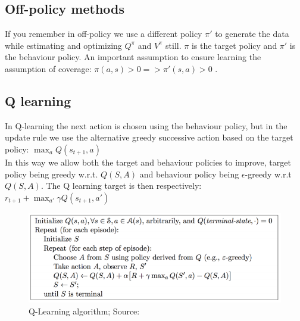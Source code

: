 
\subsection{Off-policy methods}

If you remember in off-policy we use a different policy $\pi'$ to generate the data while estimating and optimizing $Q^{\pi}$ and $V^{\pi}$ still. $\pi$ is the target policy and $\pi'$ is the  behaviour policy. An important assumption to ensure learning the assumption of coverage: $\pi(a, s) > 0 => \pi'(s, a) > 0$ \cite{lecture_mfc}.\\


\subsection{Q learning}
In Q-learning the  next action is chosen using the behaviour policy, but in the update rule we use the alternative greedy successive action based on the target policy: $\max_a Q(s_{t+1}, a)$\\

In this way we allow both the target and behaviour policies to improve, target policy being greedy w.r.t. $Q(S, A)$ and behaviour policy being $\epsilon$-greedy w.r.t $Q(S, A)$. The Q learning target is then respectively: $r_{t+1} + \max_{a'} \gamma Q(s_{t+1}, a')$\\

\begin{figure}[h!]
  \centering
  \includegraphics[scale=0.5]{figures/q_learning.PNG}
  \caption{Q-Learning algorithm; Source: \cite{lecture_mfc}}
  \label{fig:q_learning}
\end{figure}


